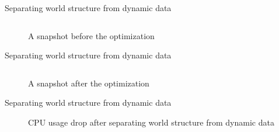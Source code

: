 \documentclass{beamer}
\begin{document}
\begin{frame}[fragile]{Separating world structure from dynamic data}
\begin{figure}[H]
\begin{center}
\inputminted[fontsize=\tiny]{js}{code/snapshot.json}
\end{center}
\caption{A snapshot before the optimization}
\end{figure}
\end{frame}
\begin{frame}{Separating world structure from dynamic data}
\begin{figure}[H]
\begin{center}
\inputminted{js}{code/optimized_snapshot.json}
\end{center}
\caption{A snapshot after the optimization}
\end{figure}
\end{frame}
\begin{frame}{Separating world structure from dynamic data}
\begin{figure}[H]
\noindent{}
\caption{CPU usage drop after separating world structure from dynamic data}
\end{figure}
\end{frame}
\end{document}
